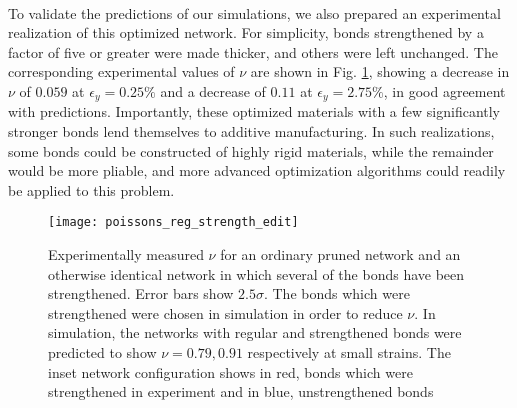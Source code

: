 \documentclass[9pt,twocolumn,twoside]{pnas-new}
\begin{document}
\paragraph{}
To validate the predictions of our simulations, we also prepared an experimental realization of this optimized network.  For simplicity, bonds strengthened by a factor of five or greater were made thicker, and others were left unchanged. The corresponding experimental values of $\nu$ are shown in Fig. \ref{fig:poissons_reg_strength}, showing a decrease in $\nu$ of $0.059$ at $\epsilon_{y}=0.25\%$ and a decrease of $0.11$ at $\epsilon_{y}=2.75\%$, in good agreement with predictions. Importantly,
these optimized materials with a few significantly stronger bonds lend themselves to additive manufacturing.  In such realizations, some bonds could be constructed of highly rigid materials, while the remainder would be more pliable, and more advanced optimization algorithms could readily be applied to this problem.
\begin{figure}
	\centering
	\texttt{[image: poissons\_reg\_strength\_edit]}
	\caption{Experimentally measured $\nu$ for an ordinary pruned network and an otherwise identical network in which several of the bonds have been strengthened.  Error bars show $2.5 \sigma$. The bonds which were strengthened were chosen in simulation in order to reduce $\nu$.  In simulation, the networks with regular and strengthened bonds were predicted to show $\nu=0.79, 0.91$ respectively at small strains.  The inset network configuration shows in red, bonds which were strengthened in experiment and in blue, unstrengthened bonds}
	\label{fig:poissons_reg_strength}
\end{figure}
	
\showmatmethods{} %
\end{document}
